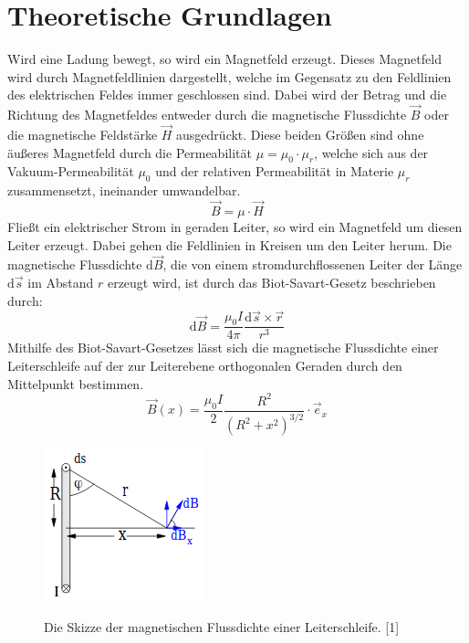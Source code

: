 \documentclass[titlepage = firstcover]{scrartcl}
\begin{document}
    \section{Theoretische Grundlagen}
      Wird eine Ladung bewegt, so wird ein Magnetfeld erzeugt. Dieses Magnetfeld wird durch Magnetfeldlinien dargestellt, welche im Gegensatz zu den
      Feldlinien des elektrischen Feldes immer geschlossen sind. Dabei wird der Betrag und die Richtung des Magnetfeldes entweder durch die magnetische
      Flussdichte $\vec{B}$ oder die magnetische Feldstärke $\vec{H}$ ausgedrückt. Diese beiden Größen sind ohne äußeres Magnetfeld durch die Permeabilität
      $\mu = \mu_0 \cdot \mu_r$, welche sich aus der Vakuum-Permeabilität $\mu_0$ und der relativen Permeabilität in Materie $\mu_r$ zusammensetzt, ineinander
      umwandelbar.
      \begin{equation}
        \vec{B} = \mu \cdot \vec{H}
      \end{equation}
      Fließt ein elektrischer Strom in geraden Leiter, so wird ein Magnetfeld um diesen Leiter erzeugt. Dabei gehen die Feldlinien in Kreisen um den
      Leiter herum. Die magnetische Flussdichte $\text{d}\vec{B}$, die von einem stromdurchflossenen Leiter der Länge $\text{d}\vec{s}$ im Abstand $r$
      erzeugt wird, ist durch das Biot-Savart-Gesetz beschrieben durch:
      \begin{equation}
        \text{d}\vec{B} = \frac{\mu_0 I}{4 \pi} \frac{\text{d}\vec{s} \times \vec{r}}{r^3}
      \end{equation}
      Mithilfe des Biot-Savart-Gesetzes lässt sich die magnetische Flussdichte einer Leiterschleife auf der zur Leiterebene orthogonalen Geraden durch den
      Mittelpunkt bestimmen.
      \begin{equation}
        \vec{B}(x) = \frac{\mu_0 I}{2} \frac{R^2}{(R^2 + x^2)^{3/2}} \cdot \vec{e}_x
      \end{equation}
      \begin{figure}[h]
        \centering
        \caption{Die Skizze der magnetischen Flussdichte einer Leiterschleife. [1]}
        \includegraphics[width = 0.25\linewidth]{Leiterschleife.png}
        \label{fig:leiterschleife}
      \end{figure}
\end{document}
